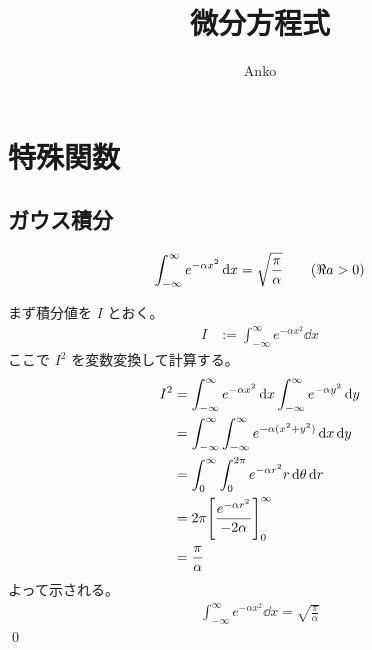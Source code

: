 \documentclass[uplatex,dvipdfmx,a4paper,11pt]{jlreq}
\title{微分方程式}
\author{Anko}
\makeatletter
\theoremstyle{definition}
\renewenvironment{proof}[1][\proofname]{\par
  \normalfont
  \topsep6\p@\@plus6\p@ \trivlist
  \item[\hskip\labelsep{\bfseries #1}\@addpunct{\bfseries}]\ignorespaces\quad\par
}{%
  \qed\endtrivlist\@endpefalse
}
\renewcommand\proofname{証明}
\makeatother
\begin{document}
\maketitle
\tableofcontents
\clearpage

\section{特殊関数}
\subsection{ガウス積分}
\begin{theorem}[Gauss 積分]
  \begin{align}
    \int_{-\infty}^{\infty} e^{-\alpha x^2}\dd{x} = \sqrt{\frac{\pi}{\alpha}} \qquad (\real a > 0)
  \end{align}
\end{theorem}
\begin{proof}
  まず積分値を $I$ とおく。
  \begin{align}
    I & := \int_{-\infty}^{\infty} e^{-\alpha x^2}\dd{x}
  \end{align}
  ここで $I^2$ を変数変換して計算する。
  \begin{align}
    I^2 & = \int_{-\infty}^{\infty} e^{-\alpha x^2}\dd{x}\int_{-\infty}^{\infty} e^{-\alpha y^2}\dd{y} \\
        & = \int_{-\infty}^{\infty}\int_{-\infty}^{\infty} e^{-\alpha(x^2 + y^2)}\dd{x}\dd{y}          \\
        & = \int_0^{\infty}\int_0^{2\pi}e^{-\alpha r^2}r\dd{\theta}\dd{r}                              \\
        & = 2\pi\qty[\frac{e^{-\alpha r^2}}{-2\alpha}]_0^{\infty}                                      \\
        & = \frac{\pi}{\alpha}
  \end{align}
  よって示される。
  \begin{align}
    \int_{-\infty}^{\infty} e^{-\alpha x^2}\dd{x} = \sqrt{\frac{\pi}{\alpha}}
  \end{align}
\end{proof}
\end{document}

